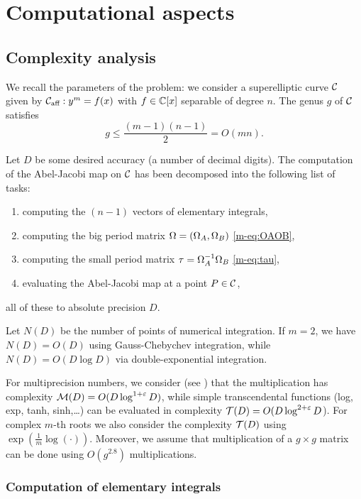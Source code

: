 \documentclass[main.tex]{subfiles}
\begin{document}
  \section{Computational aspects}\label{sec:comp_asp}

   \subsection{Complexity analysis}

   We recall the parameters of the problem: we consider a superelliptic curve $\mathcal{C}$ given by
   $\mathcal{C}_{\text{aff}}:y^m=f(x)$ with $f \in \mathbb{C}[x]$ separable of degree $n$. The genus $g$ of $\mathcal{C}$ satisfies
   $$g \leq \frac{(m-1)(n-1)}2=O(mn).$$

   Let $D$ be some desired accuracy (a number of decimal digits). The computation of
   the Abel-Jacobi map on $\mathcal{C}$ has been decomposed into the
   following list of tasks:
   \begin{enumerate}
       \item computing the $(n-1)$ vectors of elementary integrals,
       \item computing the big period matrix $\Omega=(\Omega_A,\Omega_B)$ \eqref{m-eq:OAOB},
       \item computing the small period matrix $\tau = \Omega_A^{-1}\Omega_B$ \eqref{m-eq:tau},
       \item evaluating the Abel-Jacobi map at a point $P \in \mathcal{C}$,
   \end{enumerate}
   all of these to absolute precision $D$.

   Let $N(D)$ be the number of points of numerical integration.
   If $m=2$, we have
   $N(D)=O(D)$ using Gauss-Chebychev integration, while $N(D)=O(D\log D)$
   via double-exponential integration.

   For multiprecision numbers, we consider (see \cite{BrentZimmermann}) that the multiplication has
   complexity $\mathcal M(D)=O(D \log^{1+\varepsilon}D)$,
   while simple transcendental functions (log, exp, tanh, sinh,\dots) can be evaluated
   in complexity $\mathcal T(D)=O(D\log^{2+\varepsilon} D$). For complex $m$-th roots we also consider the complexity $\mathcal T(D)$ using
   $\exp(\frac{1}{m}\log(\cdot))$.
    Moreover, we assume that multiplication of a $g \times g$ matrix can
    be done using $O(g^{2.8})$ multiplications.

   \subsubsection{Computation of elementary integrals}
   \label{sec:comp_elem}
\end{document}
